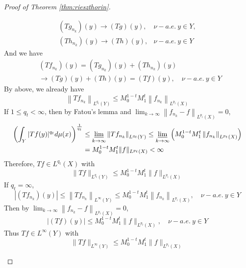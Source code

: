 \begin{proof}[Proof of Theorem \ref{thm:rieszthorin}]
\begin{enumerate}[label=(\Roman*)]
\begin{enumerate}[label=\theenumi-\arabic{*}]
			\begin{equation*}
				\begin{array}{ll}
					\left(T g_{n_k}\right)(y) \longrightarrow(T g)(y), & \nu-a.e.~ y \in Y, \\
					\left(T h_{n_k}\right)(y) \longrightarrow(T h)(y), & \nu-a.e.~ y \in Y
				\end{array}
			\end{equation*}
			And we have
			\begin{equation*}
				\begin{aligned}
					& \left(T f_{n_k}\right)(y)=\left(T g_{n_k}\right)(y)+\left(T h_{n_k}\right)(y) \\
					& \longrightarrow(T g)(y)+(T h)(y)=(T f)(y), \quad \nu-a.e.~ y \in Y
				\end{aligned}
			\end{equation*}
			By above, we already have
			\begin{equation*}
				\left\|T f_{n_k}\right\|_{L^{q_t}(Y)} \leq M_0^{1-t} M_1^t\left\|f_{n_k}\right\|_{L^{p_t}(X)}
			\end{equation*}
			If $1 \leq q_t < \infty$, then by Fatou's lemma and $\lim _{k \rightarrow \infty}\left\|f_{n_k}-f\right\|_{L^{p_t}(X)}=0$,
			\begin{equation*}
				\begin{aligned}
					\left(\int_Y|T f(y)|^{q_t} d \mu(x)\right)^{\frac{1}{q_t}} & \leq \varliminf_{k \rightarrow \infty}\left\|T f_{n_k}\right\|_{L^{q_t}(Y)} \leq \varliminf_{k \rightarrow \infty}\left(M_0^{1-t} M_1^t\left\|f_{n_k}\right\|_{L^{p_t}(X)}\right) \\
					& =M_0^{1-t} M_1^t\|f\|_{L^{p_t}(X)}<\infty
				\end{aligned}
			\end{equation*}
			Therefore, $Tf \in L^{q_t}(X)$ with
			\begin{equation*}
				\|T f\|_{L^{q_t}(Y)} \leq M_0^{1-t} M_1^t\|f\|_{L^{p_t}(X)}
			\end{equation*}
			If $q_t = \infty$,
			\begin{equation*}
				\left|\left(T f_{n_k}\right)(y)\right| \leq\left\|T f_{n_k}\right\|_{L^{\infty}(Y)} \leq M_0^{1-t} M_1^t\left\|f_{n_k}\right\|_{L^{p_t}(X)},\quad \nu-a.e.~ y \in Y
			\end{equation*}
			Then by $\lim _{k \rightarrow \infty}\left\|f_{n_k}-f\right\|_{L^{p_t}(X)}=0$,
			\begin{equation*}
				|(T f)(y)| \leq M_0^{1-t} M_1^t\|f\|_{L^{p_t}(X)},\quad \nu-a.e.~ y \in Y
			\end{equation*}
			Thus $Tf \in L^\infty(Y)$ with
			\begin{equation*}
				\|T f\|_{L^{\infty}(Y)} \leq M_0^{1-t} M_1^t\|f\|_{L^{p_t}(X)}
			\end{equation*}
		\end{enumerate}
	\end{enumerate}
\end{proof}

